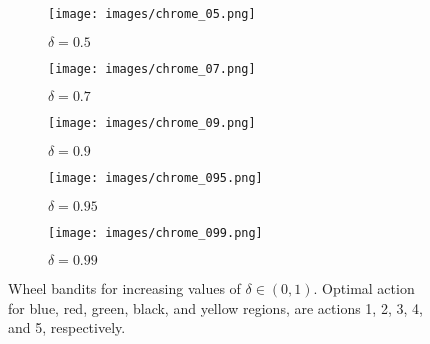 \documentclass{article} \usepackage{iclr2018_conference,times}
\begin{document}
\begin{figure}[t]
\begin{subfigure}[t]{0.18\textwidth}
  \centering
  \texttt{[image: images/chrome\_05.png]}
  \caption{$\delta = 0.5$}
  \label{fig:cb05}
\end{subfigure}\begin{subfigure}[t]{0.18\textwidth}
  \centering
  \texttt{[image: images/chrome\_07.png]}
  \caption{$\delta = 0.7$}
  \label{fig:cb07}
\end{subfigure}\begin{subfigure}[t]{0.18\textwidth}
  \centering
  \texttt{[image: images/chrome\_09.png]}
  \caption{$\delta = 0.9$}
  \label{fig:cb09}
\end{subfigure}\begin{subfigure}[t]{0.18\textwidth}
  \centering
  \texttt{[image: images/chrome\_095.png]}
  \caption{$\delta = 0.95$}
  \label{fig:cb095}
\end{subfigure}\begin{subfigure}[t]{0.18\textwidth}
  \centering
  \texttt{[image: images/chrome\_099.png]}
  \caption{$\delta = 0.99$}
  \label{fig:cb099}
\end{subfigure}
\caption{Wheel bandits for increasing values of $\delta \in (0, 1)$. Optimal action for blue, red, green, black, and yellow regions, are actions 1, 2, 3, 4, and 5, respectively.}
\label{fig:cb}
\end{figure}
\end{document}
